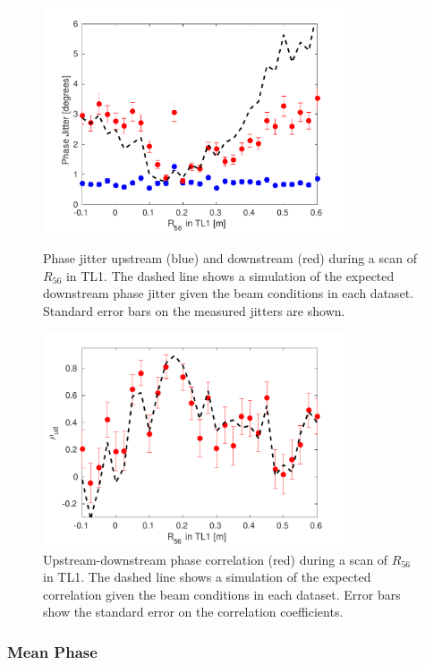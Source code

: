 \begin{figure}
  \centering
  \includegraphics[width=0.8\textwidth]{Figures/propagation/r56Scan_meanPhaseJit}
  \caption{Phase jitter upstream (blue) and downstream (red) during a scan of \(R_{56}\) in TL1. The dashed line shows a simulation of the expected downstream phase jitter given the beam conditions in each dataset. Standard error bars on the measured jitters are shown.}
  \label{f:r56Scan_meanPhaseJit}

  \includegraphics[width=0.8\textwidth]{Figures/propagation/r56Scan_correlation}
  \caption{Upstream-downstream phase correlation (red) during a scan of \(R_{56}\) in TL1. The dashed line shows a simulation of the expected correlation given the beam conditions in each dataset. Error bars show the standard error on the correlation coefficients.}
  \label{f:r56Scan_correlation}
\end{figure}


\subsubsection{Mean Phase}

